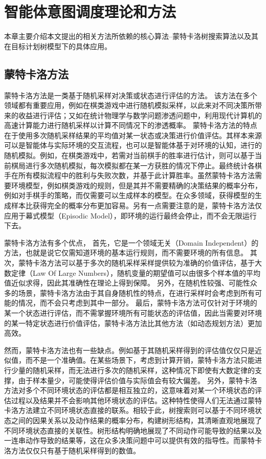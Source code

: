 \chapter{智能体意图调度理论和方法}
本章主要介绍本文提出的相关方法所依赖的核心算法--蒙特卡洛树搜索算法以及其在目标计划树模型下的具体应用。
\section{蒙特卡洛方法}
蒙特卡洛方法是一类基于随机采样对决策或状态进行评估的方法。
该方法在多个领域都有重要应用，例如在棋类游戏中进行随机模拟采样，以此来对不同决策所带来的收益进行评估；又如在统计物理学与数学问题渗透问题中，利用现代计算机的高速计算能力进行随机采样以计算不同情况下的渗透概率。
蒙特卡洛方法的特点在于使用多次随机采样结果的平均值对某一状态或决策进行价值评估。其样本来源可以是智能体与实际环境的交互流程，也可以是智能体基于对环境的认知，进行的随机模拟。例如，在棋类游戏中，若需对当前棋手的胜率进行估计，则可以基于当前棋局进行多次随机模拟，每次模拟都在某一方获胜的情况下停止。最终统计各棋手在所有模拟流程中的胜利与失败次数，并基于此计算胜率。虽然蒙特卡洛方法需要环境模型，例如棋类游戏的规则，但是其并不需要精确的决策结果的概率分布，例如对手棋手的策略，而仅需要可以生成样本的模型。在众多领域，获得模型的生成样本比获得完全的概率分布更加容易。另有一点需要注意的是，蒙特卡洛方法仅应用于幕式模型（Episodic Model），即环境的运行最终会停止，而不会无限运行下去。

蒙特卡洛方法有多个优点，
首先，它是一个领域无关（Domain Independent）的方法，也就是说它仅需知道环境的基本运行规则，而不需要环境的所有信息。
%
其次，蒙特卡洛方法可以基于多次的随机采样采样提供较为准确的价值评估，基于大数定律（Law Of Large Numbers），随机变量的期望值可以由很多个样本值的平均值近似求得，因此其准确性在理论上得到保障。
%
另外，在随机性较强、可能性众多的场景，蒙特卡洛方法由于其自身随机性的特点，在进行采样时会考虑到所有可能的情况，而不会只考虑到其中一部分。
%
最后，蒙特卡洛方法可仅针对于环境的某一个状态进行评估，而不需掌握环境所有可能状态的评估值，因此当需要对环境的某一特定状态进行价值评估，蒙特卡洛方法比其他方法（如动态规划方法）更加高效。

然而，蒙特卡洛方法也有一些缺点。例如基于其随机采样得到的评估值仅仅只是近似值，而不是一个准确值。在某些场景下，考虑到计算开销，蒙特卡洛方法只能进行少量的随机采样，而无法进行多次的随机采样，这种情况下即使有大数定律的支撑，由于样本量少，可能使得评估价值与实际值会有较大偏差。
%
另外，蒙特卡洛方法对多个不同环境状态的评估都是相互独立的，这意味着对某一个环境状态的评估过程以及结果并不会影响其他环境状态的评估。这种特性使得人们无法通过蒙特卡洛方法建立不同环境状态直接的联系。相较于此，树搜索则可以基于不同环境状态之间的因果关系以及动作结果的概率分布，构建树形结构，其清晰直观地展现了不同环境状态直接的关联性。树形结构明确地展现了不同动作可能导致的结果以及一连串动作导致的结果等，这在众多决策问题中可以提供有效的指导性。而蒙特卡洛方法仅仅只有基于随机采样得到的数值。
